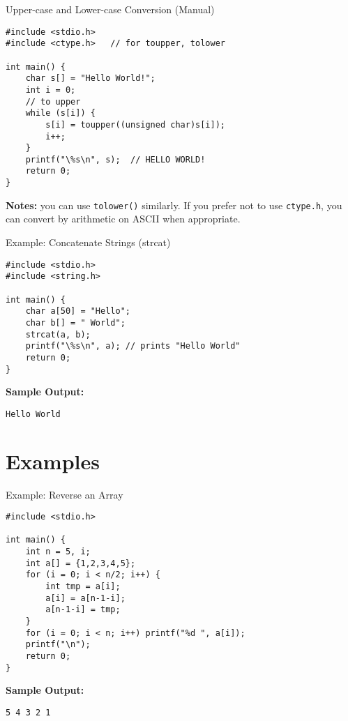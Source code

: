 \documentclass[12pt, aspectratio=169]{beamer}
\begin{document}
    \begin{frame}[fragile]{Upper-case and Lower-case Conversion (Manual)}
        \begin{verbatim}
#include <stdio.h>
#include <ctype.h>   // for toupper, tolower

int main() {
    char s[] = "Hello World!";
    int i = 0;
    // to upper
    while (s[i]) {
        s[i] = toupper((unsigned char)s[i]);
        i++;
    }
    printf("\%s\n", s);  // HELLO WORLD!
    return 0;
}
        \end{verbatim}

        \textbf{Notes:} you can use \texttt{tolower()} similarly. If you prefer not to use \texttt{ctype.h}, you can convert by arithmetic on ASCII when appropriate.
    \end{frame}

    \begin{frame}[fragile]{Example: Concatenate Strings (strcat)}
        \begin{verbatim}
#include <stdio.h>
#include <string.h>

int main() {
    char a[50] = "Hello";
    char b[] = " World";
    strcat(a, b);
    printf("\%s\n", a); // prints "Hello World"
    return 0;
}
        \end{verbatim}

        \textbf{Sample Output:}
        \begin{verbatim}
Hello World
        \end{verbatim}
    \end{frame}


    \section{Examples}

    \begin{frame}[fragile]{Example: Reverse an Array}
        \begin{verbatim}
#include <stdio.h>

int main() {
    int n = 5, i;
    int a[] = {1,2,3,4,5};
    for (i = 0; i < n/2; i++) {
        int tmp = a[i];
        a[i] = a[n-1-i];
        a[n-1-i] = tmp;
    }
    for (i = 0; i < n; i++) printf("%d ", a[i]);
    printf("\n");
    return 0;
}
        \end{verbatim}

        \textbf{Sample Output:}
        \begin{verbatim}
5 4 3 2 1
        \end{verbatim}
    \end{frame}
\end{document}
